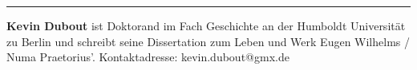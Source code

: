 \begin{center}\rule{0.5\linewidth}{\linethickness}\end{center}

\textbf{Kevin Dubout} ist Doktorand im Fach Geschichte an der Humboldt
Universität zu Berlin und schreibt seine Dissertation zum Leben und Werk
Eugen Wilhelms / Numa Praetorius'. Kontaktadresse: kevin.dubout@gmx.de
